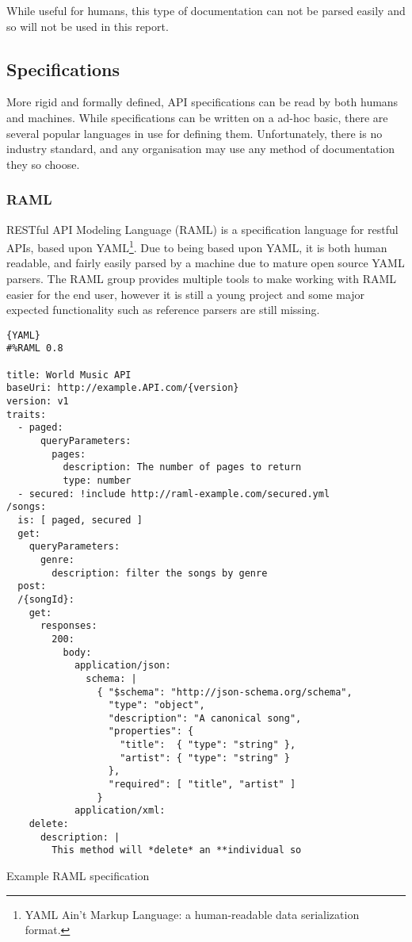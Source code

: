 While useful for humans, this type of documentation can not be parsed easily and so will not be used in this report.

\subsection{Specifications}

More rigid and formally defined, API specifications can be read by both humans and machines. While specifications can be written on a ad-hoc basic, there are several popular languages in use for defining them. Unfortunately, there is no industry standard, and any organisation may use any method of documentation they so choose.

\subsubsection{RAML}

RESTful API Modeling Language (RAML)\cite{ramlwebsite} is a specification language for restful APIs, based upon YAML\footnote{YAML Ain't Markup Language: a human-readable data serialization format.}\cite{yamlspec}. Due to being based upon YAML, it is both human readable, and fairly easily parsed by a machine due to mature open source YAML parsers. The RAML group provides multiple tools to make working with RAML easier for the end user, however it is still a young project and some major expected functionality such as reference parsers are still missing.

\begin{code}
\begin{lstlisting}[frame=lines]{YAML}
#%RAML 0.8
 
title: World Music API
baseUri: http://example.API.com/{version}
version: v1
traits:
  - paged:
      queryParameters:
        pages:
          description: The number of pages to return
          type: number
  - secured: !include http://raml-example.com/secured.yml
/songs:
  is: [ paged, secured ]
  get:
    queryParameters:
      genre:
        description: filter the songs by genre
  post:
  /{songId}:
    get:
      responses:
        200:
          body:
            application/json:
              schema: |
                { "$schema": "http://json-schema.org/schema",
                  "type": "object",
                  "description": "A canonical song",
                  "properties": {
                    "title":  { "type": "string" },
                    "artist": { "type": "string" }
                  },
                  "required": [ "title", "artist" ]
                }
            application/xml:
    delete:
      description: |
        This method will *delete* an **individual so
\end{lstlisting}
\caption{Example RAML specification}
\label{lst:my_func}
\end{code}

